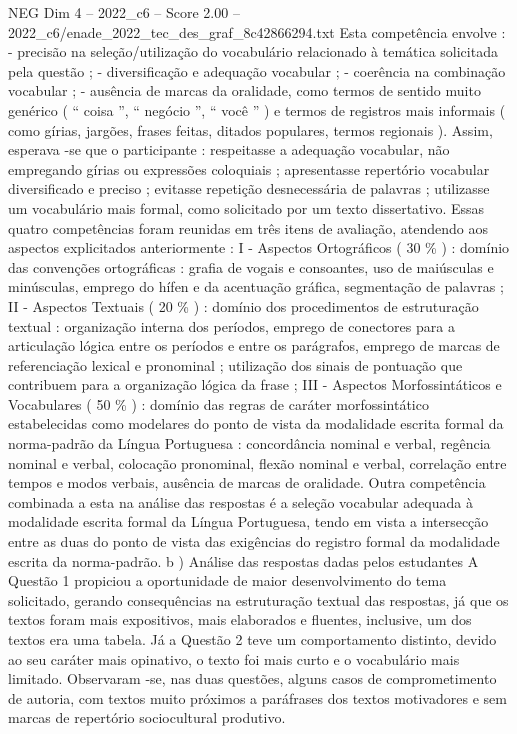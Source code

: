 \begin{textsample}{NEG Dim 4 – 2022\_c6 – Score 2.00 – 2022\_c6/enade\_2022\_tec\_des\_graf\_8c42866294.txt}
Esta competência envolve : - precisão na seleção/utilização do vocabulário relacionado à temática solicitada pela questão ; - diversificação e adequação vocabular ; - coerência na combinação vocabular ; - ausência de marcas da oralidade, como termos de sentido muito genérico ( “ coisa ”, “ negócio ”, “ você ” ) e termos de registros mais informais ( como gírias, jargões, frases feitas, ditados populares, termos regionais ).
Assim, esperava -se que o participante : respeitasse a adequação vocabular, não empregando gírias ou expressões coloquiais ; apresentasse repertório vocabular diversificado e preciso ; evitasse repetição desnecessária de palavras ; utilizasse um vocabulário mais formal, como solicitado por um texto dissertativo.
Essas quatro competências foram reunidas em três itens de avaliação, atendendo aos aspectos explicitados anteriormente : I - Aspectos Ortográficos ( 30 \% ) : domínio das convenções ortográficas : grafia de vogais e consoantes, uso de maiúsculas e minúsculas, emprego do hífen e da acentuação gráfica, segmentação de palavras ; II - Aspectos Textuais ( 20 \% ) : domínio dos procedimentos de estruturação textual : organização interna dos períodos, emprego de conectores para a articulação lógica entre os períodos e entre os parágrafos, emprego de marcas de referenciação lexical e pronominal ; utilização dos sinais de pontuação que contribuem para a organização lógica da frase ; III - Aspectos Morfossintáticos e Vocabulares ( 50 \% ) : domínio das regras de caráter morfossintático estabelecidas como modelares do ponto de vista da modalidade escrita formal da norma-padrão da Língua Portuguesa : concordância nominal e verbal, regência nominal e verbal, colocação pronominal, flexão nominal e verbal, correlação entre tempos e modos verbais, ausência de marcas de oralidade.
Outra competência combinada a esta na análise das respostas é a seleção vocabular adequada à modalidade escrita formal da Língua Portuguesa, tendo em vista a intersecção entre as duas do ponto de vista das exigências do registro formal da modalidade escrita da norma-padrão. b ) Análise das respostas dadas pelos estudantes A Questão 1 propiciou a oportunidade de maior desenvolvimento do tema solicitado, gerando consequências na estruturação textual das respostas, já que os textos foram mais expositivos, mais elaborados e fluentes, inclusive, um dos textos era uma tabela.
Já a Questão 2 teve um comportamento distinto, devido ao seu caráter mais opinativo, o texto foi mais curto e o vocabulário mais limitado.
Observaram -se, nas duas questões, alguns casos de comprometimento de autoria, com textos muito próximos a paráfrases dos textos motivadores e sem marcas de repertório sociocultural produtivo.

\end{textsample}
